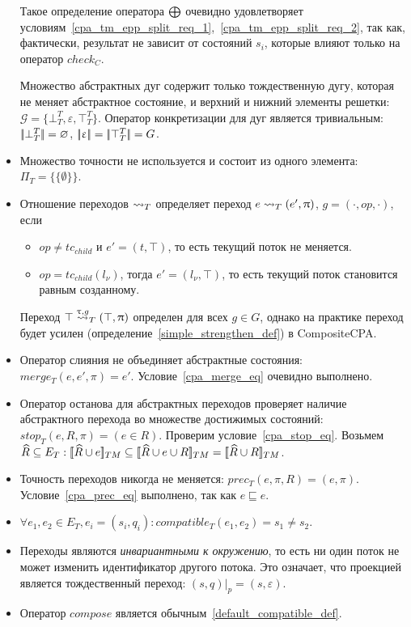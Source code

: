 \begin{itemize}
Такое определение оператора $\mathrel{\bigoplus}$ очевидно удовлетворяет условиям~\ref{cpa_tm_epp_split_req_1},~\ref{cpa_tm_epp_split_req_2}, так как, фактически, результат не зависит от состояний $s_i$, которые влияют только на оператор $check_C$.

Множество абстрактных дуг содержит только тождественную дугу, которая не меняет абстрактное состояние, и верхний и нижний элементы решетки: $\mathcal{G} = \{\bot^T_T, \varepsilon, \top^T_T\}$.
Оператор конкретизации для дуг является тривиальным: $\lvert \! \lvert \bot^T_T \rvert \! \rvert = \varnothing$, $\lvert \! \lvert \upvarepsilon \rvert \! \rvert = \lvert \! \lvert \top^T_T \rvert \! \rvert = G$.

\item Множество точности не используется и состоит из одного элемента: $\Pi_T = \{\{\emptyset\}\}$.

\item Отношение переходов $\leadsto_T$ определяет переход $e \leadsto_T (e', \uppi)$, $g=(\cdot,op,\cdot)$, если 
\begin{itemize}
\item $op\neq tc_{child}$ и $e' = (t, \top)$, то есть текущий поток не меняется.
\item $op=tc_{child}(l_\nu)$, тогда $e' = (l_\nu, \top)$, то есть текущий поток становится равным созданному.
\end{itemize}

Переход $\top \stackrel{\uptau, g}{\leadsto}_T (\top, \uppi)$ определен для всех $g\in G$, однако на практике переход будет усилен (определение~\ref{simple_strengthen_def}) в CompositeCPA.

\item Оператор слияния не объединяет абстрактные состояния: $merge_T(e, e', \pi) = e'$. Условие~\ref{cpa_merge_eq} очевидно выполнено.

\item Оператор останова для абстрактных переходов проверяет наличие абстрактного перехода во множестве достижимых состояний: $stop_T(e, R, \pi) = (e \in R)$.
Проверим условие~\ref{cpa_stop_eq}.
Возьмем $\widehat{R} \subseteq E_T: [\![ \widehat{R} \cup e ]\!]_{TM} \subseteq [\![ \widehat{R} \cup e \cup R ]\!]_{TM} = [\![ \widehat{R} \cup R ]\!]_{TM}$.

\item Точность переходов никогда не меняется: $prec_T(e, \pi, R) = (e, \pi)$. Условие~\ref{cpa_prec_eq} выполнено, так как $e \sqsubseteq e$.

\item $\forall e_1, e_2 \in E_T, e_i = (s_i, q_i):compatible_T(e_1,e_2) = s_1 \neq s_2$.

\item Переходы являются {\em инвариантными к окружению}, то есть ни один поток не может изменить идентификатор другого потока.
Это означает, что проекцией является тождественный переход:
$(s, q)|_p = (s, \varepsilon)$.

\item Оператор $compose$ является обычным~\ref{default_compatible_def}.
\end{itemize}


